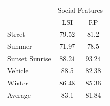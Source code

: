\begin{table}[!ht]
 \hspace{1em}\vspace*{0.5cm}
 \begin{tabular}{|p{1.7cm}|c|c|}
  \hline
{\multirow{2}{*}{Labels}} & \multicolumn{2}{|c|}{Social Features} \\ \cline{2-3}
 & LSI & RP \\ \hline
Street & 79.52 & 81.2 \\ [1ex] \hline
Summer & 71.97 & 78.5 \\ [1ex] \hline
Sunset Sunrise & 88.24 & 93.24 \\ [1ex] \hline
Vehicle & 88.5 & 82.38 \\ [1ex] \hline
Winter & 86.48 & 85.36 \\ [1ex] \hline
Average & 83.1 & 81.84 \\ [1ex] \hline
\end{tabular}
 \label{ImageCLEFAccuracySocialFeatures} %
\end{table}

